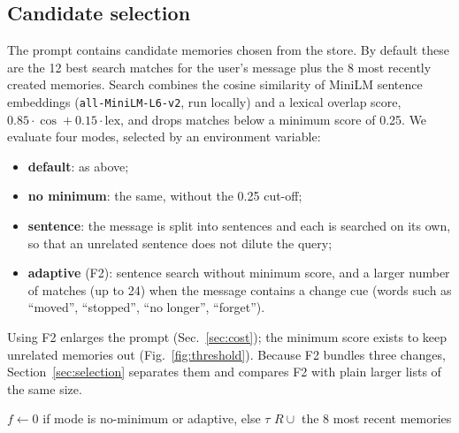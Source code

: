 \IfFileExists{IEEEtran.cls}{\documentclass[journal]{IEEEtran}\def\HAVEIEEE{1}}{\documentclass[10pt,twocolumn]{article}\usepackage[margin=0.7in,columnsep=0.25in]{geometry}}
\begin{document}
\subsection{Candidate selection}
\label{sec:candidates}
The prompt contains candidate memories chosen from the store. By default these are the 12 best search matches for the user's message plus the 8 most recently created memories. Search combines the cosine similarity of MiniLM sentence embeddings \cite{wang2020minilm} (\texttt{all-MiniLM-L6-v2}, run locally) and a lexical overlap score, $0.85\cdot\cos + 0.15\cdot\mathrm{lex}$, and drops matches below a minimum score of 0.25. We evaluate four modes, selected by an environment variable:
\begin{itemize}
\item \textbf{default}: as above;
\item \textbf{no minimum}: the same, without the 0.25 cut-off;
\item \textbf{sentence}: the message is split into sentences and each is searched on its own, so that an unrelated sentence does not dilute the query;
\item \textbf{adaptive} (F2): sentence search without minimum score, and a larger number of matches (up to 24) when the message contains a change cue (words such as ``moved'', ``stopped'', ``no longer'', ``forget'').
\end{itemize}
Using F2 enlarges the prompt (Sec.~\ref{sec:cost}); the minimum score exists to keep unrelated memories out (Fig.~\ref{fig:threshold}). Because F2 bundles three changes, Section~\ref{sec:selection} separates them and compares F2 with plain larger lists of the same size.

\begin{algorithm}[t]
\caption{Candidate selection (modes \emph{default} and \emph{adaptive})}
\label{alg:cand}
\small
{}
$f \leftarrow 0$ if mode is no-minimum or adaptive, else $\tau$\;
\Return $R \cup$ the 8 most recent memories\;
\end{algorithm}
\end{document}
